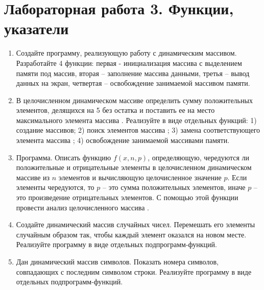 \section{Лабораторная работа 3. Функции, указатели}
\begin{enumerate}[leftmargin=*]
    \item Создайте программу, реализующую работу с динамическим массивом. Разработайте 4 функции: первая - инициализация массива с выделением памяти под массив, вторая – заполнение массива данными, третья – вывод данных на экран, четвертая – освобождение занимаемой массивом памяти. 
    \item В целочисленном динамическом массиве  определить сумму положительных элементов, делящихся на 5 без остатка и поставить ее на место максимального элемента массива . Реализуйте в виде отдельных функций: 1) создание массивов; 2) поиск элементов массива ; 3) замена соответствующего элемента массива ; 4) освобождение занимаемой массивами памяти.
    \item Программа. Описать функцию $f(x, n, p)$, определяющую, чередуются ли положительные и отрицательные элементы в целочисленном динамическом массиве  из $n$ элементов и вычисляющую целочисленное значение $p$. Если элементы чередуются, то $p$ – это сумма положительных элементов, иначе $p$ – это произведение отрицательных элементов. С помощью этой функции провести анализ целочисленного массива .
    \item Создайте динамический массив случайных чисел. Перемешать его элементы случайным образом так, чтобы каждый элемент оказался на новом месте. Реализуйте программу в виде отдельных подпрограмм-функций.
    \item Дан динамический массив символов. Показать номера символов, совпадающих с последним символом строки. Реализуйте программу в виде отдельных подпрограмм-функций.
\end{enumerate}

